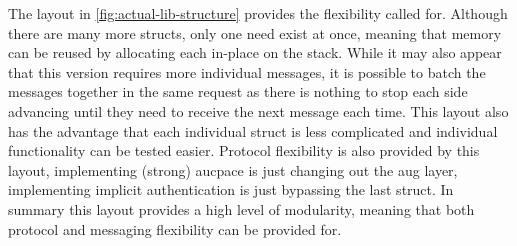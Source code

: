 The layout in \cref{fig:actual-lib-structure} provides the flexibility called for.
Although there are many more structs, only one need exist at once, meaning that memory can be reused by allocating each in-place on the stack.
While it may also appear that this version requires more individual messages, it is possible to batch the messages together in the same request as there is nothing to stop each side advancing until they need to receive the next message each time.
This layout also has the advantage that each individual struct is less complicated and individual functionality can be tested easier.
Protocol flexibility is also provided by this layout, implementing (strong) \gls{aucpace} is just changing out the aug layer, implementing implicit authentication is just bypassing the last struct.
In summary this layout provides a high level of modularity, meaning that both protocol and messaging flexibility can be provided for.

